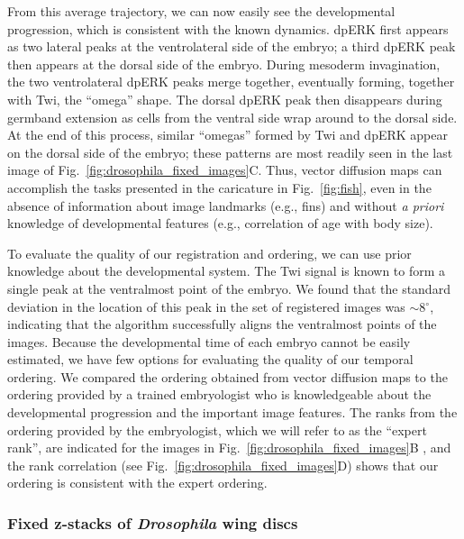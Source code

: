 \documentclass[twocolumn, 10pt]{article}
\newcommand{\fig}[0]{Fig.}
\begin{document}
From this average trajectory, we can now easily see the developmental progression, which is consistent with the known dynamics.
%
dpERK first appears as two lateral peaks at the ventrolateral side of the embryo; a third dpERK peak then appears at the dorsal side of the embryo.
%
During mesoderm invagination, the two ventrolateral dpERK peaks merge together, eventually forming, together with Twi, the ``omega'' shape.
%
The dorsal dpERK peak then disappears during germband extension as cells from the ventral side wrap around to the dorsal side.
%
At the end of this process, similar ``omegas'' formed by Twi and dpERK appear on the dorsal side of the embryo; these patterns are most readily seen in the last image of \fig~\ref{fig:drosophila_fixed_images}C.
%
Thus, vector diffusion maps can accomplish the tasks presented in the caricature in \fig~\ref{fig:fish}, even in the absence of information about image landmarks (e.g., fins) and without {\it a priori} knowledge of developmental features (e.g., correlation of age with body size).
%

To evaluate the quality of our registration and ordering, we can use prior knowledge about the developmental system.
%
The Twi signal is known to form a single peak at the ventralmost point of the embryo.
%
We found that the standard deviation in the location of this peak in the set of registered images was $\sim$8$^\circ$,
indicating that the algorithm successfully aligns the ventralmost points of the images.
%
Because the developmental time of each embryo cannot be easily estimated, we have few options for evaluating the quality of our temporal ordering.
%
We compared the ordering obtained from vector diffusion maps to the ordering provided by a trained embryologist who is knowledgeable about the developmental progression and the important image features.
%
The ranks from the ordering provided by the embryologist, which we will refer to as the ``expert rank'', are indicated for the images in \fig~\ref{fig:drosophila_fixed_images}B , and the rank correlation (see \fig~\ref{fig:drosophila_fixed_images}D) shows that our ordering is consistent with the expert ordering.



\subsubsection*{Fixed z-stacks of {\em Drosophila} wing discs}
\end{document}
